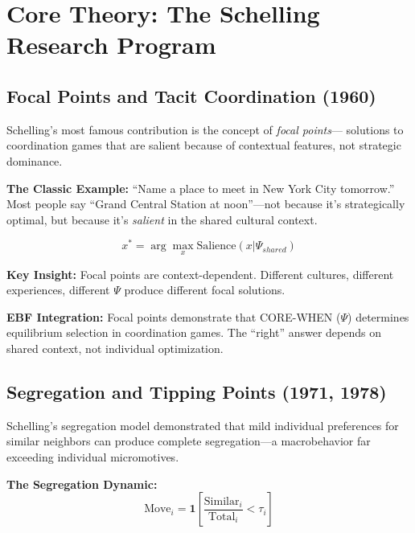 \section{Core Theory: The Schelling Research Program}
\label{sec:ts-theory}

\subsection{Focal Points and Tacit Coordination (1960)}

Schelling's most famous contribution is the concept of \textit{focal points}---
solutions to coordination games that are salient because of contextual features,
not strategic dominance.

\textbf{The Classic Example:}
``Name a place to meet in New York City tomorrow.'' Most people say ``Grand Central
Station at noon''---not because it's strategically optimal, but because it's
\textit{salient} in the shared cultural context.

\begin{equation}
x^* = \arg\max_x \text{Salience}(x | \Psi_{shared})
\label{eq:ts-focal-max}
\end{equation}

\textbf{Key Insight:} Focal points are context-dependent. Different cultures,
different experiences, different $\Psi$ produce different focal solutions.

\textbf{EBF Integration:} Focal points demonstrate that CORE-WHEN ($\Psi$)
determines equilibrium selection in coordination games. The ``right'' answer
depends on shared context, not individual optimization.

\subsection{Segregation and Tipping Points (1971, 1978)}

Schelling's segregation model demonstrated that mild individual preferences for
similar neighbors can produce complete segregation---a macrobehavior far exceeding
individual micromotives.

\textbf{The Segregation Dynamic:}
\begin{equation}
\text{Move}_i = \mathbf{1}\left[\frac{\text{Similar}_i}{\text{Total}_i} < \tau_i\right]
\label{eq:ts-segregation}
\end{equation}

